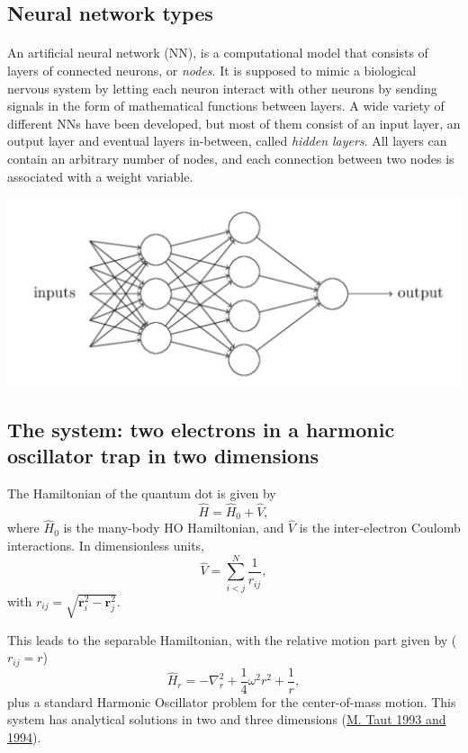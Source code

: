 \documentclass[%
oneside,                 %
final,                   %
10pt]{article}
\begin{document}
\subsection{Neural network types}

\paragraph{}
An artificial neural network (NN), is a computational model that consists of layers of connected neurons, or \emph{nodes}. 
It is supposed to mimic a biological nervous system by letting each neuron interact with other neurons
by sending signals in the form of mathematical functions between layers. 
A wide variety of different NNs have
been developed, but most of them consist of an input layer, an output layer and eventual layers in-between, called
\emph{hidden layers}. All layers can contain an arbitrary number of nodes, and each connection between two nodes
is associated with a weight variable. 



\vspace{6mm}

\centerline{\includegraphics[width=0.6\linewidth]{figures/dnn.png}}

\vspace{6mm}





\subsection{The system: two electrons in a harmonic oscillator trap in two dimensions}

The Hamiltonian of the quantum dot is given by
\[ \hat{H} = \hat{H}_0 + \hat{V}, 
\]
where $\hat{H}_0$ is the many-body HO Hamiltonian, and $\hat{V}$ is the
inter-electron Coulomb interactions. In dimensionless units,
\[ \hat{V}= \sum_{i<j}^N \frac{1}{r_{ij}},
\]
with $r_{ij}=\sqrt{\mathbf{r}_i^2 - \mathbf{r}_j^2}$.

This leads to the  separable Hamiltonian, with the relative motion part given by ($r_{ij}=r$)
\[ 
\hat{H}_r=-\nabla^2_r + \frac{1}{4}\omega^2r^2+ \frac{1}{r},
\]
plus a standard Harmonic Oscillator problem  for the center-of-mass motion.
This system has analytical solutions in two and three dimensions (\href{{https://journals.aps.org/pra/abstract/10.1103/PhysRevA.48.3561}}{M. Taut 1993 and 1994}). 
\end{document}
